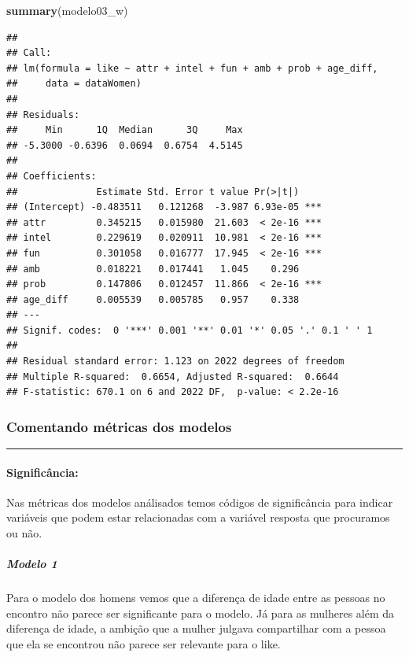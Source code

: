 \documentclass[]{article}
\newenvironment{Shaded}{\begin{snugshade}}{\end{snugshade}}
\newcommand{\KeywordTok}[1]{\textcolor[rgb]{0.13,0.29,0.53}{\textbf{#1}}}
\newcommand{\NormalTok}[1]{#1}
\let\oldparagraph\paragraph
\renewcommand{\paragraph}[1]{\oldparagraph{#1}\mbox{}}
\let\oldsubparagraph\subparagraph
\renewcommand{\subparagraph}[1]{\oldsubparagraph{#1}\mbox{}}
\begin{document}
\begin{Shaded}
\begin{Highlighting}[]
\KeywordTok{summary}\NormalTok{(modelo03_w)}
\end{Highlighting}
\end{Shaded}

\begin{verbatim}
## 
## Call:
## lm(formula = like ~ attr + intel + fun + amb + prob + age_diff, 
##     data = dataWomen)
## 
## Residuals:
##     Min      1Q  Median      3Q     Max 
## -5.3000 -0.6396  0.0694  0.6754  4.5145 
## 
## Coefficients:
##              Estimate Std. Error t value Pr(>|t|)    
## (Intercept) -0.483511   0.121268  -3.987 6.93e-05 ***
## attr         0.345215   0.015980  21.603  < 2e-16 ***
## intel        0.229619   0.020911  10.981  < 2e-16 ***
## fun          0.301058   0.016777  17.945  < 2e-16 ***
## amb          0.018221   0.017441   1.045    0.296    
## prob         0.147806   0.012457  11.866  < 2e-16 ***
## age_diff     0.005539   0.005785   0.957    0.338    
## ---
## Signif. codes:  0 '***' 0.001 '**' 0.01 '*' 0.05 '.' 0.1 ' ' 1
## 
## Residual standard error: 1.123 on 2022 degrees of freedom
## Multiple R-squared:  0.6654, Adjusted R-squared:  0.6644 
## F-statistic: 670.1 on 6 and 2022 DF,  p-value: < 2.2e-16
\end{verbatim}

\hypertarget{comentando-muxe9tricas-dos-modelos}{%
\subsubsection{Comentando métricas dos
modelos}\label{comentando-muxe9tricas-dos-modelos}}

\begin{center}\rule{0.5\linewidth}{\linethickness}\end{center}

\hypertarget{significuxe2ncia}{%
\paragraph{Significância:}\label{significuxe2ncia}}

Nas métricas dos modelos análisados temos códigos de significância para
indicar variáveis que podem estar relacionadas com a variável resposta
que procuramos ou não.

\hypertarget{modelo-1}{%
\subparagraph{Modelo 1}\label{modelo-1}}

Para o modelo dos homens vemos que a diferença de idade entre as pessoas
no encontro não parece ser significante para o modelo. Já para as
mulheres além da diferença de idade, a ambição que a mulher julgava
compartilhar com a pessoa que ela se encontrou não parece ser relevante
para o like.
\end{document}

